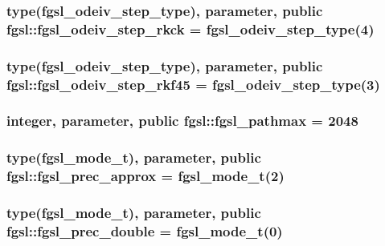 \subsubsection[{fgsl\+\_\+odeiv\+\_\+step\+\_\+rkck}]{\setlength{\rightskip}{0pt plus 5cm}type({\bf fgsl\+\_\+odeiv\+\_\+step\+\_\+type}), parameter, public fgsl\+::fgsl\+\_\+odeiv\+\_\+step\+\_\+rkck = {\bf fgsl\+\_\+odeiv\+\_\+step\+\_\+type}(4)}\label{namespacefgsl_a0c2cde787f3c705f883a74b1be126952}
\hypertarget{namespacefgsl_ad73c3dd0c5faf790ac4fe7c6bdfe0b75}{}
\subsubsection[{fgsl\+\_\+odeiv\+\_\+step\+\_\+rkf45}]{\setlength{\rightskip}{0pt plus 5cm}type({\bf fgsl\+\_\+odeiv\+\_\+step\+\_\+type}), parameter, public fgsl\+::fgsl\+\_\+odeiv\+\_\+step\+\_\+rkf45 = {\bf fgsl\+\_\+odeiv\+\_\+step\+\_\+type}(3)}\label{namespacefgsl_ad73c3dd0c5faf790ac4fe7c6bdfe0b75}
\hypertarget{namespacefgsl_a4531e537443b76eab7842214d4e86f01}{}
\subsubsection[{fgsl\+\_\+pathmax}]{\setlength{\rightskip}{0pt plus 5cm}integer, parameter, public fgsl\+::fgsl\+\_\+pathmax = 2048}\label{namespacefgsl_a4531e537443b76eab7842214d4e86f01}
\hypertarget{namespacefgsl_ab6d5bd94526f9dacea9ce2293a66c824}{}
\subsubsection[{fgsl\+\_\+prec\+\_\+approx}]{\setlength{\rightskip}{0pt plus 5cm}type({\bf fgsl\+\_\+mode\+\_\+t}), parameter, public fgsl\+::fgsl\+\_\+prec\+\_\+approx = {\bf fgsl\+\_\+mode\+\_\+t}(2)}\label{namespacefgsl_ab6d5bd94526f9dacea9ce2293a66c824}
\hypertarget{namespacefgsl_a974fb113c1c5dced8257e1eae0def683}{}
\subsubsection[{fgsl\+\_\+prec\+\_\+double}]{\setlength{\rightskip}{0pt plus 5cm}type({\bf fgsl\+\_\+mode\+\_\+t}), parameter, public fgsl\+::fgsl\+\_\+prec\+\_\+double = {\bf fgsl\+\_\+mode\+\_\+t}(0)}\label{namespacefgsl_a974fb113c1c5dced8257e1eae0def683}
\hypertarget{namespacefgsl_ac6801c472f4316aa060668c157db61bd}{}
